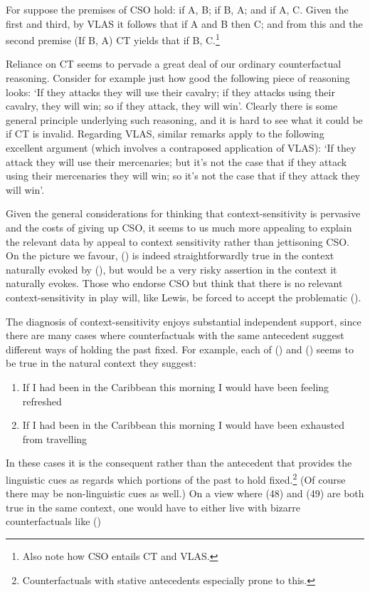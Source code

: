 For suppose the premises of CSO hold: if A, B; if B, A; and if A, C.
Given the first and third, by VLAS it follows that if A and B then C;
and from this and the second premise (If B, A) CT yields that if B,
C.\footnote{Also note how CSO entails CT and VLAS.}

Reliance on CT seems to pervade a great deal of our ordinary
counterfactual reasoning. Consider for example just how good the
following piece of reasoning looks: `If they attacks they will use their
cavalry; if they attacks using their cavalry, they will win; so if they
attack, they will win'. Clearly there is some general principle
underlying such reasoning, and it is hard to see what it could be if CT
is invalid. Regarding VLAS, similar remarks apply to the following
excellent argument (which involves a contraposed application of VLAS):
`If they attack they will use their mercenaries; but it's not the case
that if they attack using their mercenaries they will win; so it's not
the case that if they attack they will win'.

Given the general considerations for thinking that context-sensitivity
is pervasive and the costs of giving up CSO, it seems to us much more
appealing to explain the relevant data by appeal to context sensitivity
rather than jettisoning CSO. On the picture we favour, () is indeed
straightforwardly true in the context naturally evoked by (), but would
be a very risky assertion in the context it naturally evokes. Those who
endorse CSO but think that there is no relevant context-sensitivity in
play will, like Lewis, be forced to accept the problematic ().

The diagnosis of context-sensitivity enjoys substantial independent
support, since there are many cases where counterfactuals with the same
antecedent suggest different ways of holding the past fixed. For
example, each of () and () seems to be true in the natural context they
suggest:

\begin{enumerate}
\def\labelenumi{(\arabic{enumi})}
\setcounter{enumi}{47}
\item
  If I had been in the Caribbean this morning I would have been feeling
  refreshed
\item
  If I had been in the Caribbean this morning I would have been
  exhausted from travelling
\end{enumerate}

In these cases it is the consequent rather than the antecedent that
provides the linguistic cues as regards which portions of the past to
hold fixed.\footnote{Counterfactuals with stative antecedents especially
  prone to this.} (Of course there may be non-linguistic cues as well.)
On a view where (48) and (49) are both true in the same context, one
would have to either live with bizarre counterfactuals like ()

